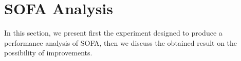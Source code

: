 %


\section{SOFA Analysis}
\label{sec:sofa-analysis}

In this section, we present first the experiment designed to produce a performance analysis of \gls{SOFA}, then we discuss the obtained result on the possibility of improvements.

